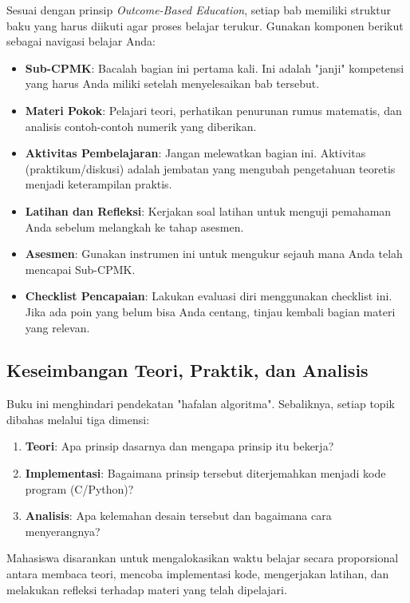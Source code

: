 Sesuai dengan prinsip \textit{Outcome-Based Education}, setiap bab memiliki struktur baku yang harus diikuti agar proses belajar terukur. Gunakan komponen berikut sebagai navigasi belajar Anda:
\begin{itemize}
  \item \textbf{Sub-CPMK}: Bacalah bagian ini pertama kali. Ini adalah "janji" kompetensi yang harus Anda miliki setelah menyelesaikan bab tersebut.
  \item \textbf{Materi Pokok}: Pelajari teori, perhatikan penurunan rumus matematis, dan analisis contoh-contoh numerik yang diberikan.
  \item \textbf{Aktivitas Pembelajaran}: Jangan melewatkan bagian ini. Aktivitas (praktikum/diskusi) adalah jembatan yang mengubah pengetahuan teoretis menjadi keterampilan praktis.
  \item \textbf{Latihan dan Refleksi}: Kerjakan soal latihan untuk menguji pemahaman Anda sebelum melangkah ke tahap asesmen.
  \item \textbf{Asesmen}: Gunakan instrumen ini untuk mengukur sejauh mana Anda telah mencapai Sub-CPMK.
  \item \textbf{Checklist Pencapaian}: Lakukan evaluasi diri menggunakan checklist ini. Jika ada poin yang belum bisa Anda centang, tinjau kembali bagian materi yang relevan.
\end{itemize}

\subsection{Keseimbangan Teori, Praktik, dan Analisis}

Buku ini menghindari pendekatan "hafalan algoritma". Sebaliknya, setiap topik dibahas melalui tiga dimensi:
\begin{enumerate}
    \item \textbf{Teori}: Apa prinsip dasarnya dan mengapa prinsip itu bekerja?
    \item \textbf{Implementasi}: Bagaimana prinsip tersebut diterjemahkan menjadi kode program (C/Python)?
    \item \textbf{Analisis}: Apa kelemahan desain tersebut dan bagaimana cara menyerangnya?
\end{enumerate}

Mahasiswa disarankan untuk mengalokasikan waktu belajar secara proporsional antara membaca teori, mencoba implementasi kode, mengerjakan latihan, dan melakukan refleksi terhadap materi yang telah dipelajari.

